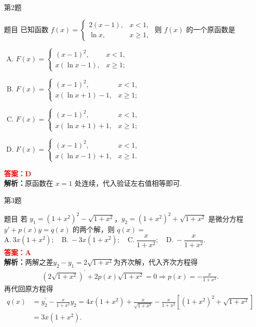 \documentclass[aspectratio=169]{beamer}
\begin{document}
\begin{frame}{第2题}
\begin{block}{题目}
已知函数 \(f(x)= \begin{cases}2(x-1), & x<1, \\ \ln x, & x \geqslant 1,\end{cases}\)
则 \(f(x)\) 的一个原函数是
\begin{enumerate}[A.]
\item \(F(x)=\begin{cases}(x-1)^{2}, & x<1, \\ x(\ln x-1), & x \geqslant 1;\end{cases}\)
\item \(F(x)=\begin{cases}(x-1)^{2}, & x<1, \\ x(\ln x+1)-1, & x \geqslant 1;\end{cases}\)
\item \(F(x)=\begin{cases}(x-1)^{2}, & x<1, \\ x(\ln x+1)+1, & x \geqslant 1;\end{cases}\)
\item \(F(x)=\begin{cases}(x-1)^{2}, & x<1, \\ x(\ln x-1)+1, & x \geqslant 1.\end{cases}\)
\end{enumerate}
\textcolor{red}{\textbf{答案：}$\mathbf{D}$} \\
\textbf{解析：}原函数在 $x=1$ 处连续，代入验证左右值相等即可.
\end{block}
\end{frame}

\begin{frame}{第3题}
\begin{block}{题目}
若 \(y_1=(1+x^{2})^{2}-\sqrt{1+x^{2}}\)，\(y_2=(1+x^{2})^{2}+\sqrt{1+x^{2}}\) 是微分方程 \(y'+p(x) y=q(x)\) 的两个解，则 \(q(x)=\)
$\mathrm{A.}\ 3 x\left(1+x^{2}\right); \quad
\mathrm{B.}\ -3 x\left(1+x^{2}\right); \quad
\mathrm{C.}\ \dfrac{x}{1+x^{2}}; \quad
\mathrm{D.}\ -\dfrac{x}{1+x^{2}}$.
\\
\textcolor{red}{\textbf{答案：}$\mathbf{A}$} \\
\textbf{解析：}两解之差$y_2-y_1=2\sqrt{1+x^2}$为齐次解，代入齐次方程得
\begin{align*}
\left( 2\sqrt{1+x^2} \right) ^{\prime}+2p\left( x \right) \sqrt{1+x^2}=0\Longrightarrow p\left( x \right) =-\frac{x}{1+x^2}.
\end{align*}
再代回原方程得
\begin{align*}
q\left( x \right) &=y_{2}^{\prime}-\frac{x}{1+x^2}y_2=4x\left( 1+x^2 \right) +\frac{x}{\sqrt{1+x^2}}-\frac{x}{1+x^2}\left[ \left( 1+x^2 \right) ^2+\sqrt{1+x^2} \right] 
\\
&=3x\left( 1+x^2 \right) .
\end{align*}
\end{block}
\end{frame}
\end{document}
